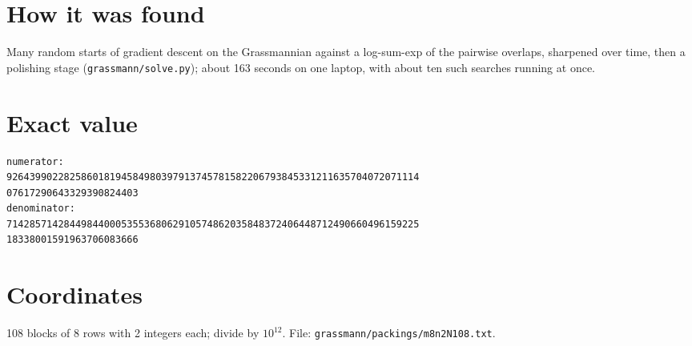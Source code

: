 \documentclass[11pt,a4paper]{article}
\begin{document}
\section{How it was found}
Many random starts of gradient descent on the Grassmannian against a log-sum-exp of the pairwise overlaps, sharpened over time, then a polishing stage (\texttt{grassmann/solve.py}); about 163 seconds on one laptop, with about ten such searches running at once.


\appendix
\section{Exact value}
{\small
\begin{verbatim}
numerator:
926439902282586018194584980397913745781582206793845331211635704072071114
07617290643329390824403
denominator:
714285714284498440005355368062910574862035848372406448712490660496159225
18338001591963706083666
\end{verbatim}}

\section{Coordinates}
108 blocks of 8 rows with 2 integers each; divide by $10^{12}$. File: \texttt{grassmann/packings/m8n2N108.txt}.
{\tiny
\begin{multicols}{4}
\end{multicols}}
\end{document}
